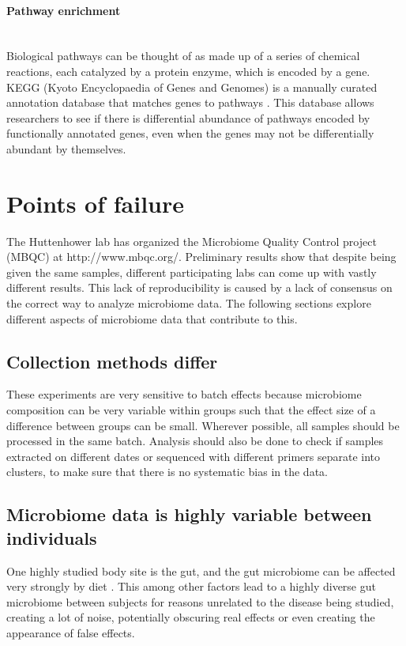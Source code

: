 \paragraph{Pathway enrichment}\mbox{}\\
Biological pathways can be thought of as made up of a series of chemical reactions, each catalyzed by a protein enzyme, which is encoded by a gene. KEGG (Kyoto Encyclopaedia of Genes and Genomes) is a manually curated annotation database that matches genes to pathways \cite{kanehisa2000kegg}. This database allows researchers to see if there is differential abundance of pathways encoded by functionally annotated genes, even when the genes may not be differentially abundant by themselves.

\section{Points of failure}
The Huttenhower lab has organized the Microbiome Quality Control project (MBQC) at http://www.mbqc.org/. Preliminary results show that despite being given the same samples, different participating labs can come up with vastly different results. This lack of reproducibility is caused by a lack of consensus on the correct way to analyze microbiome data. The following sections explore different aspects of microbiome data that contribute to this.

\subsection{Collection methods differ}
These experiments are very sensitive to batch effects because microbiome composition can be very variable within groups such that the effect size of a difference between groups can be small. Wherever possible, all samples should be processed in the same batch. Analysis should also be done to check if samples extracted on different dates or sequenced with different primers separate into clusters, to make sure that there is no systematic bias in the data.

\subsection{Microbiome data is highly variable between individuals}
One highly studied body site is the gut, and the gut microbiome can be affected very strongly by diet \cite{turnbaugh2009effect}. This among other factors lead to a highly diverse gut microbiome between subjects for reasons unrelated to the disease being studied, creating a lot of noise, potentially obscuring real effects or even creating the appearance of false effects.

